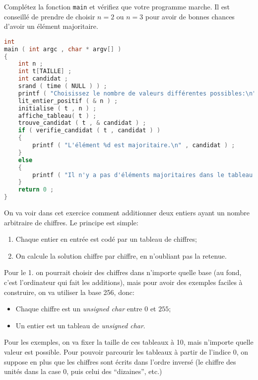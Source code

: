 \question Complétez la fonction \texttt{main} et vérifiez que votre programme marche. Il est conseillé de prendre de choisir \(n=2\) ou \(n=3\) pour avoir de bonnes chances d'avoir un élément majoritaire.

\begin{solution}
  \begin{lstlisting}[language=C]
int 
main ( int argc , char * argv[] )
{
    int n ;
    int t[TAILLE] ;
    int candidat ;
    srand ( time ( NULL ) ) ;
    printf ( "Choisissez le nombre de valeurs différentes possibles:\n" ) ;
    lit_entier_positif ( & n ) ;
    initialise ( t , n ) ;
    affiche_tableau( t ) ;
    trouve_candidat ( t , & candidat ) ;
    if ( verifie_candidat ( t , candidat ) )
    {
        printf ( "L'élément %d est majoritaire.\n" , candidat ) ;
    }
    else
    {
        printf ( "Il n'y a pas d'éléments majoritaires dans le tableau.\n") ;
    }
    return 0 ;
}
  \end{lstlisting}
\end{solution}



On va voir dans cet exercice comment additionner deux entiers
ayant un nombre arbitraire de chiffres. Le principe est simple:
\begin{enumerate}
\item Chaque entier en entrée est codé par un tableau de chiffres;
\item On calcule la solution chiffre par chiffre, en n'oubliant pas 
  la retenue.
\end{enumerate}

Pour le 1. on pourrait choisir des chiffres dans n'importe quelle base
(au fond, c'est l'ordinateur qui fait les additions), mais pour avoir
des exemples faciles à construire, on va utiliser la base 256, donc:
\begin{itemize}
\item Chaque chiffre est un \emph{unsigned char} entre \(0\) et \(255\);
\item Un entier est un tableau de \emph{unsigned char}.
\end{itemize}
Pour les exemples, on va fixer la taille de ces tableaux à 10, mais
n'importe quelle valeur est possible. Pour pouvoir parcourir les
tableaux à partir de l'indice 0, on suppose en plus que les chiffres
sont écrits dans l'ordre inversé (le chiffre des unités dans la case
0, puis celui des ``dizaines'', etc.)

